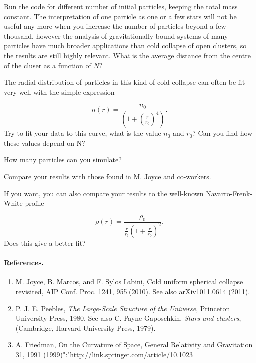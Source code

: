 \documentclass[%
oneside,                 %
final,                   %
10pt]{article}
\begin{document}
Run the code for different number of initial particles, keeping the
total mass constant. The interpretation of one particle as one or a few stars will not be useful any more when you increase the number of particles beyond a few thousand, however the analysis of gravitationally bound systems of many particles have much broader applications than cold collapse of open clusters, so the results are still highly relevant. What is the average distance from the centre of the cluser as a function of $N$?

The radial distribution of particles in this kind of cold collapse can often be fit very well with the simple expression

\begin{equation*} 
n(r) = \frac{n_0}{\left(1 +\left(\frac{r}{r_0}\right)^4\right)}.
\end{equation*}
Try to fit your data to this curve, what is the value $n_0$ and $r_0$? Can you find how these values depend on N?

How many particles can you simulate?

Compare your results with those found in  \href{{http://dx.doi.org/10.1063/1.3462740}}{M. Joyce and co-workers}.

If you want, you can also compare your results to the well-known Navarro-Frenk-White profile

\begin{equation*} 
\rho(r) = \frac{\rho_0}{\frac{r}{r_0}\left(1 +\frac{r}{r_0}\right)^2}.
\end{equation*}
Does this give a  better fit?


\paragraph{References.}
\begin{enumerate}
\item \href{{http://dx.doi.org/10.1063/1.3462740}}{M. Joyce, B. Marcos, and F. Sylos Labini, Cold uniform spherical collapse revisited, AIP Conf. Proc. 1241, 955 (2010)}. See also \href{{http://arxiv.org/abs/1011.0614}}{arXiv1011.0614 (2011)}.

\item P. J. E. Peebles, \emph{The Large-Scale Structure of the Universe}, Princeton University Press, 1980. See also C. Payne-Gaposchkin,  \emph{Stars and clusters}, (Cambridge, Harvard University Press, 1979).

\item A. Friedman,  On the Curvature of Space,  General Relativity and Gravitation 31,  1991 (1999)":"http://link.springer.com/article/10.1023%
\end{enumerate}
\end{document}
